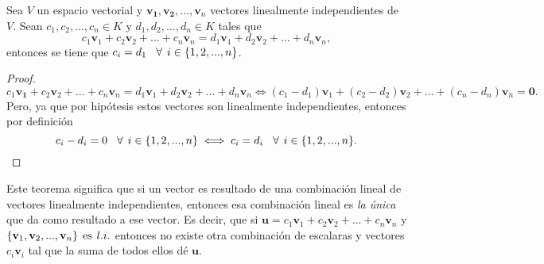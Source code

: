 \documentclass[12pt]{article}
\newenvironment{teorema}[2][Teorema]{\begin{trivlist}
\item[\hskip \labelsep {\bfseries #1}\hskip \labelsep {\bfseries #2.}]}{\end{trivlist}}
\begin{document}
\begin{teorema} {3.3.3.1} 

    Sea $V$ un espacio vectorial y $\mathbf{v_1}, \mathbf{v_2}, ..., \mathbf{v}_n$ vectores linealmente independientes de $V$. Sean $c_1, c_2, ..., c_n\in K$ y $d_1, d_2, ..., d_n\in K$ tales que $$c_1\mathbf{v}_1+c_2\mathbf{v}_2+...+c_n\mathbf{v}_n=d_1\mathbf{v}_1+d_2\mathbf{v}_2+...+d_n\mathbf{v}_n,$$ entonces se tiene que $c_i=d_1\hspace{3mm}\forall\hspace{1.5mm}i\in\{1,2, ..., n\}$.

    \begin{proof}

        $$c_1\mathbf{v_1}+c_2\mathbf{v}_2+...+c_n\mathbf{v}_n=d_1\mathbf{v}_1+d_2\mathbf{v}_2+...+d_n\mathbf{v}_n\iff(c_1-d_1)\mathbf{v}_1+(c_2-d_2)\mathbf{v}_2+...+(c_n-d_n)\mathbf{v}_n=\mathbf{0}.$$ Pero, ya que por hipótesis estos vectores son linealmente independientes, entonces por definición $$c_i-d_i=0\hspace{3mm}\forall\hspace{1.5mm}i\in\{1,2, ...,n\}\iff c_i=d_i\hspace{3mm}\forall\hspace{1.5mm}i\in\{1,2, ...,n\}.$$

    \end{proof}

    Este teorema significa que si un vector es resultado de una combinación lineal de vectores linealmente independientes, entonces esa combinación lineal es \emph{la única} que da como resultado a ese vector. Es decir, que si $\mathbf{u}=c_1\mathbf{v}_1+c_2\mathbf{v}_2+...+c_n\mathbf{v}_n$ y $\{\mathbf{v}_1,\mathbf{v}_2, ...,\mathbf{v}_n\}\hspace{1.5mm}\text{es}\hspace{1.5mm} l.i.$ entonces no existe otra combinación de escalaras y vectores $c_i \mathbf{v}_i$ tal que la suma de todos ellos dé $\mathbf{u}$.

\end{teorema}
\end{document}
